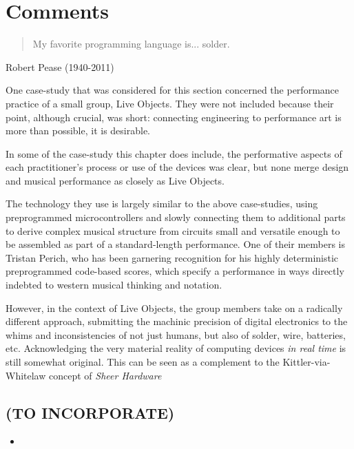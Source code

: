 \section{Comments}

\begin{quote}
	
	My favorite programming language is... solder. 
	
	\end{quote}
	
	Robert Pease (1940-2011)

One case-study that was considered for this section concerned the performance practice of a small group, Live Objects. They were not included because their point, although crucial, was short: connecting engineering to performance art is more than possible, it is desirable. 

In some of the case-study this chapter does include, the performative aspects of each practitioner's process or use of the devices was clear, but none merge design and musical performance as closely as Live Objects. 

The technology they use is largely similar to the above case-studies, using preprogrammed microcontrollers and slowly connecting them to additional parts to derive complex musical structure from circuits small and versatile enough to be assembled as part of a standard-length performance. One of their members is Tristan Perich, who has been garnering recognition for his highly deterministic preprogrammed code-based scores, which specify a performance in ways directly indebted to western musical thinking and notation. 

However, in the context of Live Objects, the group members take on a radically different approach, submitting the machinic precision of digital electronics to the whims and inconsistencies of not just humans, but also of solder, wire, batteries, etc. Acknowledging the very material reality of computing devices \emph{in real time} is still somewhat original. This can be seen as a complement to the Kittler-via-Whitelaw concept of \emph{Sheer Hardware} \citep{whitelaw2013}






\begin{unsortedStuff}	
\section*{(TO INCORPORATE)}
	\begin{itemize}
		\item 
	\end{itemize}
\end{unsortedStuff}
		
\begin{optBlankSpace}
	\newpage
	\mbox{}
\end{optBlankSpace}


